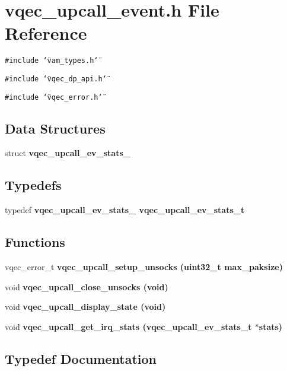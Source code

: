 \section{vqec\_\-upcall\_\-event.h File Reference}
\label{vqec__upcall__event_8h}
{\tt \#include \char`\"{}vam\_\-types.h\char`\"{}}\par
{\tt \#include \char`\"{}vqec\_\-dp\_\-api.h\char`\"{}}\par
{\tt \#include \char`\"{}vqec\_\-error.h\char`\"{}}\par
\subsection*{Data Structures}
\begin{CompactItemize}
\item 
struct \bf{vqec\_\-upcall\_\-ev\_\-stats\_\-}
\end{CompactItemize}
\subsection*{Typedefs}
\begin{CompactItemize}
\item 
typedef \bf{vqec\_\-upcall\_\-ev\_\-stats\_\-} \bf{vqec\_\-upcall\_\-ev\_\-stats\_\-t}
\end{CompactItemize}
\subsection*{Functions}
\begin{CompactItemize}
\item 
vqec\_\-error\_\-t \bf{vqec\_\-upcall\_\-setup\_\-unsocks} (uint32\_\-t max\_\-paksize)
\item 
void \bf{vqec\_\-upcall\_\-close\_\-unsocks} (void)
\item 
void \bf{vqec\_\-upcall\_\-display\_\-state} (void)
\item 
void \bf{vqec\_\-upcall\_\-get\_\-irq\_\-stats} (\bf{vqec\_\-upcall\_\-ev\_\-stats\_\-t} $\ast$stats)
\end{CompactItemize}


\subsection{Typedef Documentation}
